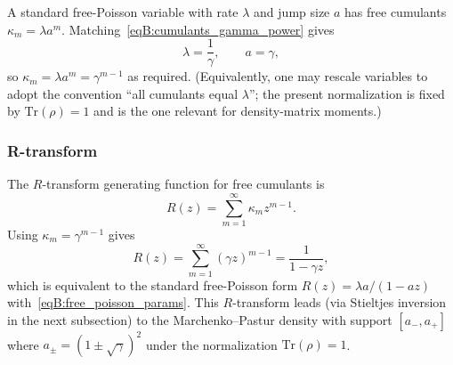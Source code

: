 \documentclass[11pt,letterpaper]{article}
\theoremstyle{plain}
\theoremstyle{definition}
\theoremstyle{remark}
\begin{document}
A standard free-Poisson variable with rate $\lambda$ and jump size $a$ has free cumulants $\kappa_m=\lambda a^m$.
Matching~\eqref{eqB:cumulants_gamma_power} gives
\begin{equation}
\label{eqB:free_poisson_params}
\lambda=\frac{1}{\gamma},\qquad a=\gamma,
\end{equation}
so $\kappa_m=\lambda a^m=\gamma^{m-1}$ as required. (Equivalently, one may rescale variables to adopt the convention “all cumulants equal $\lambda$”; the present normalization is fixed by $\mathrm{Tr}(\rho)=1$ and is the one relevant for density-matrix moments.)

\subsubsection*{R-transform}

The $R$-transform generating function for free cumulants is
\begin{equation}
\label{eqB:r_transform_def}
R(z)=\sum_{m=1}^{\infty}\kappa_m z^{m-1}.
\end{equation}
Using $\kappa_m=\gamma^{m-1}$ gives
\begin{equation}
\label{eqB:r_transform_correct}
R(z)=\sum_{m=1}^{\infty}(\gamma z)^{m-1}=\frac{1}{1-\gamma z},
\end{equation}
which is equivalent to the standard free-Poisson form $R(z)=\lambda a/(1-a z)$ with~\eqref{eqB:free_poisson_params}. This $R$-transform leads (via Stieltjes inversion in the next subsection) to the Marchenko--Pastur density with support $[a_-,a_+]$ where $a_\pm=(1\pm\sqrt{\gamma})^2$ under the normalization $\mathrm{Tr}(\rho)=1$.
\end{document}
